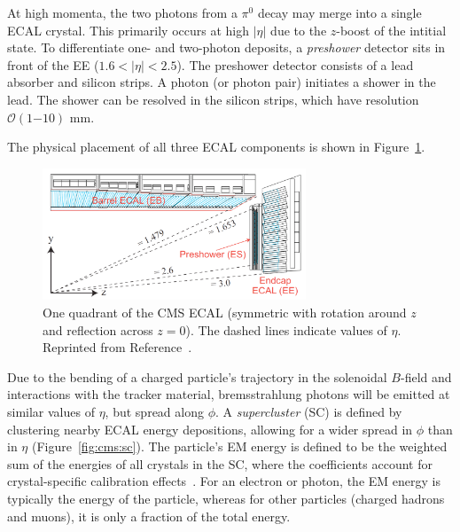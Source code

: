 At high momenta, the two photons from a $\pi^0$ decay may merge into a single ECAL crystal. 
This primarily occurs at high $|\eta|$ due to the $z$-boost of the intitial state.
To differentiate one- and two-photon deposits, a \emph{preshower} detector sits in front of the EE ($1.6 < |\eta|<2.5$).
The preshower detector consists of a lead absorber and silicon strips.
A photon (or photon pair) initiates a shower in the lead.
The shower can be resolved in the silicon strips, which have resolution $\mathcal{O}(1\mathrm{-}10)$ mm.

The physical placement of all three ECAL components is shown in Figure~\ref{fig:cms:ecal}.

\begin{figure}[]
    \begin{center} 
        \includegraphics[width=0.7\textwidth]{figures/cms/ecal.png}
        \caption{One quadrant of the CMS ECAL (symmetric with rotation around $z$ and reflection across $z=0$).
                 The dashed lines indicate values of $\eta$.
                 Reprinted from Reference~\cite{cmsecaljinst}.}
        \label{fig:cms:ecal}
    \end{center}
\end{figure}

Due to the bending of a charged particle's trajectory in the solenoidal $B$-field and interactions with the tracker material, bremsstrahlung photons will be emitted at similar values of $\eta$, but spread along $\phi$.
A \emph{supercluster} (SC) is defined by clustering nearby ECAL energy depositions, allowing for a wider spread in $\phi$ than in $\eta$ (Figure~\ref{fig:cms:sc}).
The particle's EM energy is defined to be the weighted sum of the energies of all crystals in the SC, where the coefficients account for crystal-specific calibration effects~\cite{cmsecalreco}.
For an electron or photon, the EM energy is typically the energy of the particle, whereas for other particles (charged hadrons and muons), it is only a fraction of the total energy.

